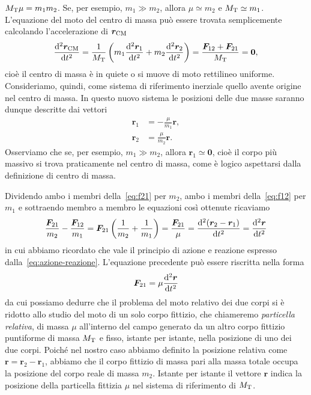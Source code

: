 $M_\textup{T}\mu=m_1m_2$. Se, per esempio, $m_1\gg m_2$, allora $\mu\simeq m_2$ e
$M_\textup{T}\simeq m_1$. L'equazione del moto del centro di massa può essere
trovata semplicemente calcolando l'accelerazione di $\bm{r}_\textup{CM}$
\begin{equation}
  \toder[2]{\bm{r}_\textup{CM}}{t} = \frac{1}{M_\textup{T}}
  \left(
    m_1\toder[2]{\bm{r}_1}{t} + m_2\toder[2]{\bm{r}_2}{t}
  \right) = \frac{\bm{F}_{12}+\bm{F}_{21}}{M_\textup{T}} = \bm{0},
\end{equation}
cioè il centro di massa è in quiete o si muove di moto rettilineo
uniforme. Consideriamo, quindi, come sistema di riferimento inerziale quello
avente origine nel centro di massa. In questo nuovo sistema le posizioni delle
due masse saranno dunque descritte dai vettori
\begin{subequations}
  \label{eq:r1-r2-nel-cdm}
  \begin{align}
    \bm{r}_1 &= -\frac{\mu}{m_1}\bm{r}, \label{eq:r1-nel-cdm}\\
    \bm{r}_2 &= \frac{\mu}{m_2}\bm{r}.
  \end{align}
\end{subequations}
Osserviamo che se, per esempio, $m_1\gg m_2$, allora $\bm{r}_1\simeq\bm{0}$,
cioè il corpo più massivo si trova praticamente nel centro di massa, come è
logico aspettarsi dalla definizione di centro di massa.

Dividendo ambo i membri della~\eqref{eq:f21} per $m_2$, ambo i membri
della~\eqref{eq:f12} per $m_1$ e sottraendo membro a membro le equazioni così
ottenute ricaviamo
\begin{equation}
  \frac{\bm{F}_{21}}{m_2}-\frac{\bm{F}_{12}}{m_1} = \bm{F}_{21}
  \left(
    \frac{1}{m_2}+\frac{1}{m_1}
  \right) = \frac{\bm{F}_{21}}{\mu} = \toder[2]{(\bm{r}_2-\bm{r}_1)}{t} =
  \toder[2]{\bm{r}}{t}
\end{equation}
in cui abbiamo ricordato che vale il principio di azione e reazione espresso
dalla~\eqref{eq:azione-reazione}. L'equazione precedente può essere riscritta
nella forma
\begin{equation}
  \label{eq:f21-mu}
  \bm{F}_{21}=\mu\toder[2]{\bm{r}}{t}
\end{equation}
da cui possiamo dedurre che il problema del moto relativo dei due corpi si è
ridotto allo studio del moto di un solo corpo fittizio, che chiameremo
\emph{particella relativa}, di massa $\mu$ all'interno del campo generato da un
altro corpo fittizio puntiforme di massa $M_\textup{T}$ e fisso, istante per
istante, nella posizione di uno dei due corpi. Poiché nel nostro caso abbiamo
definito la posizione relativa come $\bm{r}=\bm{r}_2 - \bm{r}_1$, abbiamo che il
corpo fittizio di massa pari alla massa totale occupa la posizione del corpo
reale di massa $m_2$. Istante per istante il vettore $\bm{r}$ indica la
posizione della particella fittizia $\mu$ nel sistema di riferimento di
$M_\textup{T}$.

